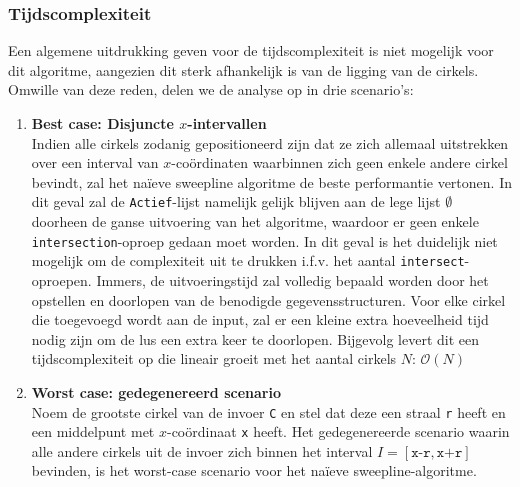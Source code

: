 \documentclass[12pt]{article}
\begin{document}
\subsubsection{Tijdscomplexiteit}\label{sec:naiveSL}
Een algemene uitdrukking geven voor de tijdscomplexiteit is niet mogelijk voor dit algoritme, aangezien dit sterk afhankelijk is van de ligging van de cirkels. Omwille van deze reden, delen we de analyse op in drie scenario's:
\begin{enumerate}
	\item \textbf{Best case: Disjuncte $ x $-intervallen}\\
		Indien alle cirkels zodanig gepositioneerd zijn dat ze zich allemaal uitstrekken over een interval van $ x $-coördinaten waarbinnen zich geen enkele andere cirkel bevindt, zal het naïeve sweepline algoritme de beste performantie vertonen. In dit geval zal de \texttt{Actief}-lijst namelijk gelijk blijven aan de lege lijst $\emptyset$ doorheen de ganse uitvoering van het algoritme, waardoor er geen enkele \texttt{intersection}-oproep gedaan moet worden. In dit geval is het duidelijk niet mogelijk om de complexiteit uit te drukken i.f.v. het aantal \texttt{intersect}-oproepen. Immers, de uitvoeringstijd zal volledig bepaald worden door het opstellen en doorlopen van de benodigde gegevensstructuren. Voor elke cirkel die toegevoegd wordt aan de input, zal er een kleine extra hoeveelheid tijd nodig zijn om de lus een extra keer te doorlopen. Bijgevolg levert dit een tijdscomplexiteit op die lineair groeit met het aantal cirkels $ N $: $ \mathcal{O}(N) $  
	\item \textbf{Worst case: gedegenereerd scenario}\\
		Noem de grootste cirkel van de invoer \texttt{C} en stel dat deze een straal \texttt{r} heeft en een middelpunt met $ x $-coördinaat \texttt{x} heeft. Het gedegenereerde scenario waarin alle andere cirkels uit de invoer zich binnen het interval $I = \left[\texttt{x-r}, \texttt{x+r}\right] $ bevinden, is het worst-case scenario voor het naïeve sweepline-algoritme.
		

\end{enumerate}
\end{document}
